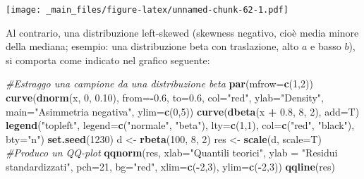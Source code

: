 \documentclass[a4paper,12pt,oneside]{book}
\newenvironment{Shaded}{\begin{snugshade}}{\end{snugshade}}
\newcommand{\KeywordTok}[1]{\textcolor[rgb]{0.13,0.29,0.53}{\textbf{#1}}}
\newcommand{\DataTypeTok}[1]{\textcolor[rgb]{0.13,0.29,0.53}{#1}}
\newcommand{\DecValTok}[1]{\textcolor[rgb]{0.00,0.00,0.81}{#1}}
\newcommand{\FloatTok}[1]{\textcolor[rgb]{0.00,0.00,0.81}{#1}}
\newcommand{\StringTok}[1]{\textcolor[rgb]{0.31,0.60,0.02}{#1}}
\newcommand{\CommentTok}[1]{\textcolor[rgb]{0.56,0.35,0.01}{\textit{#1}}}
\newcommand{\OperatorTok}[1]{\textcolor[rgb]{0.81,0.36,0.00}{\textbf{#1}}}
\newcommand{\NormalTok}[1]{#1}
\theoremstyle{definition}
\theoremstyle{definition}
\theoremstyle{definition}
\theoremstyle{remark}
\begin{document}
\texttt{[image: \_main\_files/figure-latex/unnamed-chunk-62-1.pdf]}

Al contrario, una distribuzione left-skewed (skewness negativo, cioè
media minore della mediana; esempio: una distribuzione beta con
traslazione, alto \(a\) e basso \(b\)), si comporta come indicato nel
grafico seguente:

\begin{Shaded}
\begin{Highlighting}[]
\CommentTok{#Estraggo una campione da una distribuzione beta}
\KeywordTok{par}\NormalTok{(}\DataTypeTok{mfrow=}\KeywordTok{c}\NormalTok{(}\DecValTok{1}\NormalTok{,}\DecValTok{2}\NormalTok{))}
\KeywordTok{curve}\NormalTok{(}\KeywordTok{dnorm}\NormalTok{(x, }\DecValTok{0}\NormalTok{, }\FloatTok{0.10}\NormalTok{), }\DataTypeTok{from=}\OperatorTok{-}\FloatTok{0.6}\NormalTok{, }\DataTypeTok{to=}\FloatTok{0.6}\NormalTok{, }\DataTypeTok{col=}\StringTok{"red"}\NormalTok{, }
      \DataTypeTok{ylab=}\StringTok{"Density"}\NormalTok{, }\DataTypeTok{main=}\StringTok{"Asimmetria negativa"}\NormalTok{,}
      \DataTypeTok{ylim=}\KeywordTok{c}\NormalTok{(}\DecValTok{0}\NormalTok{,}\DecValTok{5}\NormalTok{))}
\KeywordTok{curve}\NormalTok{(}\KeywordTok{dbeta}\NormalTok{(x }\OperatorTok{+}\StringTok{ }\FloatTok{0.8}\NormalTok{, }\DecValTok{8}\NormalTok{, }\DecValTok{2}\NormalTok{), }\DataTypeTok{add=}\NormalTok{T)}
\KeywordTok{legend}\NormalTok{(}\StringTok{"topleft"}\NormalTok{, }\DataTypeTok{legend=}\KeywordTok{c}\NormalTok{(}\StringTok{"normale"}\NormalTok{, }\StringTok{"beta"}\NormalTok{),}
       \DataTypeTok{lty=}\KeywordTok{c}\NormalTok{(}\DecValTok{1}\NormalTok{,}\DecValTok{1}\NormalTok{), }\DataTypeTok{col=}\KeywordTok{c}\NormalTok{(}\StringTok{"red"}\NormalTok{, }\StringTok{"black"}\NormalTok{), }\DataTypeTok{bty=}\StringTok{"n"}\NormalTok{)}
\KeywordTok{set.seed}\NormalTok{(}\DecValTok{1230}\NormalTok{)}
\NormalTok{d <-}\StringTok{ }\KeywordTok{rbeta}\NormalTok{(}\DecValTok{100}\NormalTok{, }\DecValTok{8}\NormalTok{, }\DecValTok{2}\NormalTok{)}
\NormalTok{res <-}\StringTok{ }\KeywordTok{scale}\NormalTok{(d, }\DataTypeTok{scale=}\NormalTok{T)}
\CommentTok{#Produco un QQ-plot}
\KeywordTok{qqnorm}\NormalTok{(res, }\DataTypeTok{xlab=}\StringTok{"Quantili teorici"}\NormalTok{, }
     \DataTypeTok{ylab =} \StringTok{"Residui  standardizzati"}\NormalTok{, }
     \DataTypeTok{pch=}\DecValTok{21}\NormalTok{, }\DataTypeTok{bg=}\StringTok{"red"}\NormalTok{, }\DataTypeTok{xlim=}\KeywordTok{c}\NormalTok{(}\OperatorTok{-}\DecValTok{2}\NormalTok{,}\DecValTok{3}\NormalTok{), }\DataTypeTok{ylim=}\KeywordTok{c}\NormalTok{(}\OperatorTok{-}\DecValTok{2}\NormalTok{,}\DecValTok{3}\NormalTok{))}
\KeywordTok{qqline}\NormalTok{(res)}
\end{Highlighting}
\end{Shaded}
\end{document}
